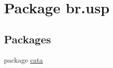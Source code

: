 \hypertarget{namespacebr_1_1usp}{\section{Package br.\+usp}
\label{namespacebr_1_1usp}
}
\subsection*{Packages}
\begin{DoxyCompactItemize}
\item 
package \hyperlink{namespacebr_1_1usp_1_1cata}{cata}
\end{DoxyCompactItemize}
